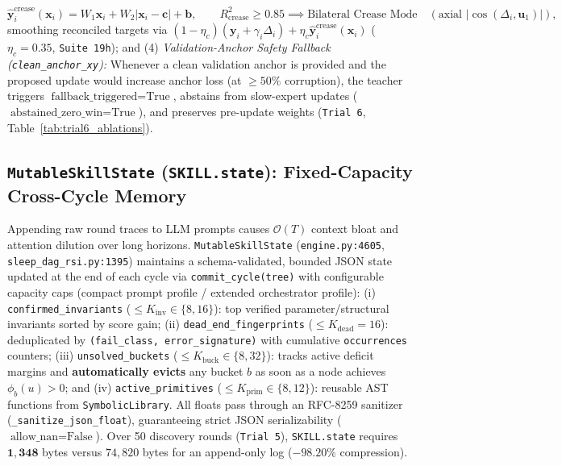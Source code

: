 \documentclass[11pt,a4paper]{article}
\begin{document}
\begin{equation}
\hat{\mathbf{y}}_i^{\text{crease}}(\mathbf{x}_i) = W_1 \mathbf{x}_i + W_2 |\mathbf{x}_i - \mathbf{c}| + \mathbf{b}, \qquad R^2_{\text{crease}} \ge 0.85 \implies \text{Bilateral Crease Mode} \quad (\text{axial } |\cos(\Delta_i, \mathbf{u}_1)|),
\tag{15a}\label{eq:sdpo_crease}
\end{equation}
smoothing reconciled targets via $(1-\eta_c)(\mathbf{y}_i + \gamma_i \Delta_i) + \eta_c \hat{\mathbf{y}}_i^{\text{crease}}(\mathbf{x}_i)$ ($\eta_c = 0.35$, \texttt{Suite 19h}); and
(4) \emph{Validation-Anchor Safety Fallback (\texttt{clean\_anchor\_xy}):} Whenever a clean validation anchor is provided and the proposed update would increase anchor loss (at $\ge 50\%$ corruption), the teacher triggers $\text{fallback\_triggered} = \text{True}$, abstains from slow-expert updates ($\text{abstained\_zero\_win} = \text{True}$), and preserves pre-update weights (\texttt{Trial 6}, Table~\ref{tab:trial6_ablations}).

\subsection{\texttt{MutableSkillState} (\texttt{SKILL.state}): Fixed-Capacity Cross-Cycle Memory}

Appending raw round traces to LLM prompts causes $\mathcal{O}(T)$ context bloat and attention dilution over long horizons. \texttt{MutableSkillState} (\texttt{engine.py:4605}, \texttt{sleep\_dag\_rsi.py:1395}) maintains a schema-validated, bounded JSON state updated at the end of each cycle via \texttt{commit\_cycle(tree)} with configurable capacity caps (compact prompt profile / extended orchestrator profile):
(i) \texttt{confirmed\_invariants} ($\le K_{\text{inv}} \in \{8, 16\}$): top verified parameter/structural invariants sorted by score gain;
(ii) \texttt{dead\_end\_fingerprints} ($\le K_{\text{dead}} = 16$): deduplicated by \texttt{(fail\_class, error\_signature)} with cumulative \texttt{occurrences} counters;
(iii) \texttt{unsolved\_buckets} ($\le K_{\text{buck}} \in \{8, 32\}$): tracks active deficit margins and \textbf{automatically evicts} any bucket $b$ as soon as a node achieves $\phi_b(u) > 0$; and
(iv) \texttt{active\_primitives} ($\le K_{\text{prim}} \in \{8, 12\}$): reusable AST functions from \texttt{SymbolicLibrary}.
All floats pass through an RFC-8259 sanitizer (\texttt{\_sanitize\_json\_float}), guaranteeing strict JSON serializability ($\text{allow\_nan}=\text{False}$). Over 50 discovery rounds (\texttt{Trial 5}), \texttt{SKILL.state} requires $\mathbf{1,348}$ bytes versus $74,820$ bytes for an append-only log ($\mathbf{-98.20\%}$ compression).
\end{document}
